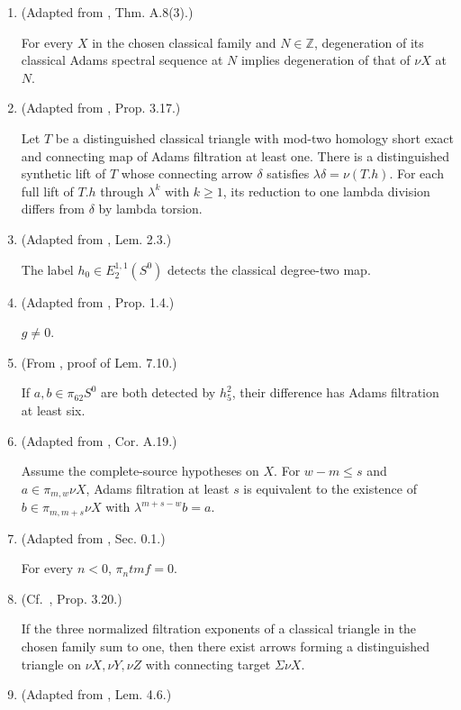\begin{theorem}
\begin{enumerate}
The realization of the normalized synthetic $\eta\in\pi_{1,2}S^{0,0}$ is the classical Hopf map $\eta$.
\item (Adapted from \cite{BHS}, Thm. A.8(3).)\par{}

For every $X$ in the chosen classical family and $N\in\mathbb Z$, degeneration of its classical Adams spectral sequence at $N$ implies degeneration of that of $\nu X$ at $N$.
\item (Adapted from \cite{LWX126}, Prop. 3.17.)\par{}

Let $T$ be a distinguished classical triangle with mod-two homology short exact and connecting map of Adams filtration at least one. There is a distinguished synthetic lift of $T$ whose connecting arrow $\delta$ satisfies $\lambda\delta=\nu(T.h)$. For each full lift of $T.h$ through $\lambda^k$ with $k\ge1$, its reduction to one lambda division differs from $\delta$ by lambda torsion.
\item (Adapted from \cite{Adams58}, Lem. 2.3.)\par{}

The label $h_0\in E_2^{1,1}(S^0)$ detects the classical degree-two map.
\item (Adapted from \cite{BR21}, Prop. 1.4.)\par{}

$g\ne0$.
\item (From \cite{LWX126}, proof of Lem. 7.10.)\par{}

If $a,b\in\pi_{62}S^0$ are both detected by $h_5^2$, their difference has Adams filtration at least six.
\item (Adapted from \cite{BHS}, Cor. A.19.)\par{}

Assume the complete-source hypotheses on $X$. For $w-m\le s$ and $a\in\pi_{m,w}\nu X$, Adams filtration at least $s$ is equivalent to the existence of $b\in\pi_{m,m+s}\nu X$ with $\lambda^{m+s-w}b=a$.
\item (Adapted from \cite{BR21}, Sec. 0.1.)\par{}

For every $n<0$, $\pi_n\mathit{tmf}=0$.
\item (Cf.\ \cite{LWX126}, Prop. 3.20.)\par{}

If the three normalized filtration exponents of a classical triangle in the chosen family sum to one, then there exist arrows forming a distinguished triangle on $\nu X,\nu Y,\nu Z$ with connecting target $\Sigma\nu X$.
\item (Adapted from \cite{May01}, Lem. 4.6.)\par{}


\end{enumerate}
\end{theorem}
